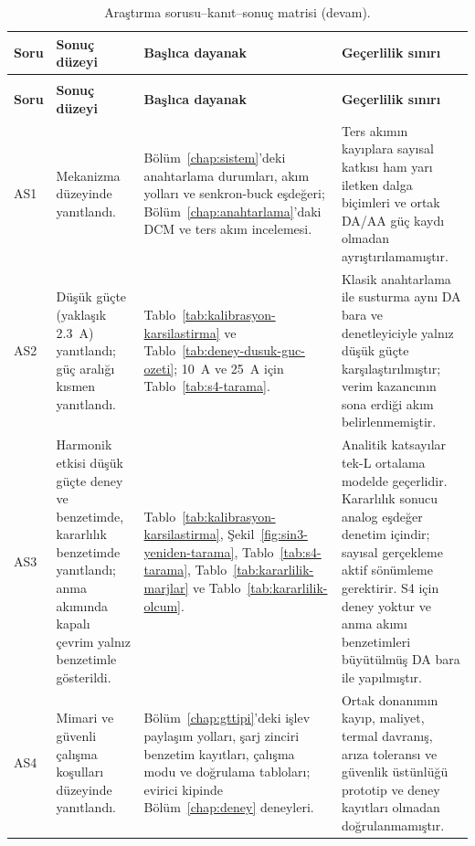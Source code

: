\begin{longtable}{@{}>{\raggedright\arraybackslash}p{}>{\raggedright\arraybackslash}p{}>{\raggedright\arraybackslash}p{}>{\raggedright\arraybackslash}p{}@{}}
  \caption{Araştırma sorusu--kanıt--sonuç matrisi.}
  \label{tab:arastirma-sorusu-kanit}\\
  \toprule
  \textbf{Soru} & \textbf{Sonuç düzeyi} & \textbf{Başlıca dayanak} & \textbf{Geçerlilik sınırı} \\
  \midrule
  \endfirsthead
  \caption[]{Araştırma sorusu--kanıt--sonuç matrisi (devam).}\\
  \toprule
  \textbf{Soru} & \textbf{Sonuç düzeyi} & \textbf{Başlıca dayanak} & \textbf{Geçerlilik sınırı} \\
  \midrule
  \endhead
  \bottomrule
  \endfoot
  AS1 & Mekanizma düzeyinde yanıtlandı. & Bölüm~\ref{chap:sistem}'deki anahtarlama durumları, akım yolları ve senkron-buck eşdeğeri; Bölüm~\ref{chap:anahtarlama}'daki DCM ve ters akım incelemesi. & Ters akımın kayıplara sayısal katkısı ham yarı iletken dalga biçimleri ve ortak DA/AA güç kaydı olmadan ayrıştırılamamıştır. \\
  AS2 & Düşük güçte (yaklaşık \SI{2.3}{\ampere}) yanıtlandı; güç aralığı kısmen yanıtlandı. & Tablo~\ref{tab:kalibrasyon-karsilastirma} ve Tablo~\ref{tab:deney-dusuk-guc-ozeti}; \SI{10}{\ampere} ve \SI{25}{\ampere} için Tablo~\ref{tab:s4-tarama}. & Klasik anahtarlama ile susturma aynı DA bara ve denetleyiciyle yalnız düşük güçte karşılaştırılmıştır; verim kazancının sona erdiği akım belirlenmemiştir. \\
  AS3 & Harmonik etkisi düşük güçte deney ve benzetimde, kararlılık benzetimde yanıtlandı; anma akımında kapalı çevrim yalnız benzetimle gösterildi. & Tablo~\ref{tab:kalibrasyon-karsilastirma}, Şekil~\ref{fig:sin3-yeniden-tarama}, Tablo~\ref{tab:s4-tarama}, Tablo~\ref{tab:kararlilik-marjlar} ve Tablo~\ref{tab:kararlilik-olcum}. & Analitik katsayılar tek-L ortalama modelde geçerlidir. Kararlılık sonucu analog eşdeğer denetim içindir; sayısal gerçekleme aktif sönümleme gerektirir. S4 için deney yoktur ve anma akımı benzetimleri büyütülmüş DA bara ile yapılmıştır. \\
  AS4 & Mimari ve güvenli çalışma koşulları düzeyinde yanıtlandı. & Bölüm~\ref{chap:gttipi}'deki işlev paylaşım yolları, şarj zinciri benzetim kayıtları, çalışma modu ve doğrulama tabloları; evirici kipinde Bölüm~\ref{chap:deney} deneyleri. & Ortak donanımın kayıp, maliyet, termal davranış, arıza toleransı ve güvenlik üstünlüğü prototip ve deney kayıtları olmadan doğrulanmamıştır. \\
\end{longtable}

